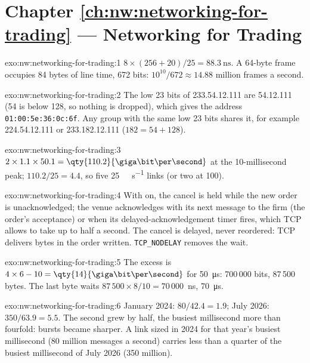 \section*{Chapter \ref{ch:nw:networking-for-trading} --- Networking for Trading}

\begin{solution}{exo:nw:networking-for-trading:1}
$8 \times (256 + 20) / 25 = \qty{88.3}{\nano\second}$. A 64-byte frame occupies 84 bytes of line time, 672 bits:
$10^{10}/672 \approx 14.88$ million frames a second.
\end{solution}

\begin{solution}{exo:nw:networking-for-trading:2}
The low 23 bits of 233.54.12.111 are 54.12.111 (54 is below 128, so nothing is dropped), which gives the address
\texttt{01:00:5e:36:0c:6f}. Any group
with the same low 23 bits shares it, for example 224.54.12.111 or 233.182.12.111 ($182 = 54 + 128$).
\end{solution}

\begin{solution}{exo:nw:networking-for-trading:3}
$2 \times 1.1 \times 50.1 = \qty{110.2}{\giga\bit\per\second}$ at the 10-millisecond peak; $110.2/25 = 4.4$, so five
\qty{25}{\giga\bit\per\second} links (or two at 100).
\end{solution}

\begin{solution}{exo:nw:networking-for-trading:4}
With  on, the cancel is held while the new order is unacknowledged; the venue acknowledges with its next
message to the firm (the order's acceptance) or when its delayed-acknowledgement timer fires, which TCP allows to take up to
half a second. The cancel is delayed, never reordered: TCP delivers bytes in the order written. \texttt{TCP\_NODELAY} removes
the wait.
\end{solution}

\begin{solution}{exo:nw:networking-for-trading:5}
The excess is $4 \times 6 - 10 = \qty{14}{\giga\bit\per\second}$ for \qty{50}{\micro\second}: 700\,000 bits, 87\,500 bytes. The
last byte waits $87\,500 \times 8 / 10 = 70\,000$~ns, \qty{70}{\micro\second}.
\end{solution}

\begin{solution}{exo:nw:networking-for-trading:6}
January 2024: $80 / 42.4 = 1.9$; July 2026: $350 / 63.9 = 5.5$. The second grew by half, the busiest millisecond more than
fourfold: bursts became sharper. A link sized in 2024 for that year's busiest millisecond (80 million messages a second)
carries less than a quarter of the busiest millisecond of July 2026 (350 million).
\end{solution}

